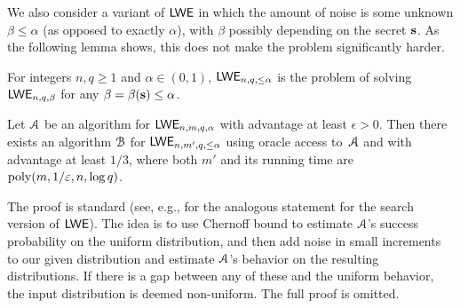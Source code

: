 We also consider a variant of $\mathsf{LWE}$ in which the amount of noise is some unknown $\beta \le \alpha$ (as opposed
to exactly $\alpha$), with $\beta$ possibly depending on the secret $\mathbf{s}$. As the following lemma shows, this 
does not make the problem significantly harder.

\begin{definition}\label{def:lelwe}
For integers $n,q \ge 1$ and $\alpha \in (0,1)$, $\mathsf{LWE}_{n,q,\le\alpha}$ is the problem of solving $\mathsf{LWE}_{n,q,\beta}$ for any $\beta = \beta(\mathbf{{s}}) \le \alpha$.
\end{definition}

\begin{lemma}\label{lem:lelwe}
Let ${\cal A}$ be an algorithm for $\mathsf{LWE}_{n, m, q, \alpha}$ with advantage at least $\epsilon>0$. Then there exists an algorithm ${\cal B}$ for $\mathsf{LWE}_{n,m',q,\le\alpha}$ using oracle access to~${\cal A}$ and with advantage at least $1/3$, where both $m'$ and its running time are $\operatorname{poly}(m,1/\varepsilon, n, \log q)$.
\end{lemma}

The proof is standard (see, e.g., \cite[Lemma 3.7]{DBLP:journals/jacm/Regev09} for
the analogous statement for the search version of $\mathsf{LWE}$). The idea is to use Chernoff bound to estimate ${\cal A}$'s success probability on the uniform distribution, and then add noise in small increments to our given distribution and estimate ${\cal A}$'s behavior on the resulting distributions. If there is a gap between any of these and the uniform behavior, the input distribution is deemed non-uniform. The full proof is omitted.

